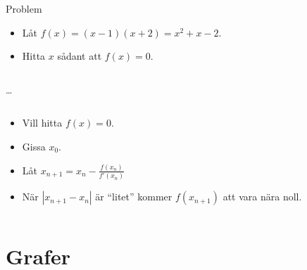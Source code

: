 \begin{frame}
  \begin{block}{Problem}
    \begin{itemize}
      \item Låt \(f(x) = (x-1)(x+2) = x^2 + x -2\).
      \item Hitta \(x\) sådant att \(f(x) = 0\).
    \end{itemize}
  \end{block}
\end{frame}

\begin{frame}[fragile]
  \inputminted[linenos,firstline=1,lastline=3]{python}{examples/nr.py}
  \dots
  \inputminted[linenos,firstline=18,lastline=23]{python}{examples/nr.py}
\end{frame}

\begin{frame}
  \begin{definition}
    \begin{itemize}
      \item Vill hitta \(f(x) = 0\).
      \item Gissa \(x_0\).
      \item Låt \(x_{n+1} = x_n - \frac{f(x_n)}{f'(x_n)}\)
      \item När \(|x_{n+1} - x_n|\) är \enquote{litet} kommer \(f(x_{n+1})\) 
        att vara nära noll.
    \end{itemize}
  \end{definition}
\end{frame}

\begin{frame}[fragile]
  \inputminted[linenos,firstline=5,lastline=15]{python}{examples/nr.py}
\end{frame}


\section{Grafer}

